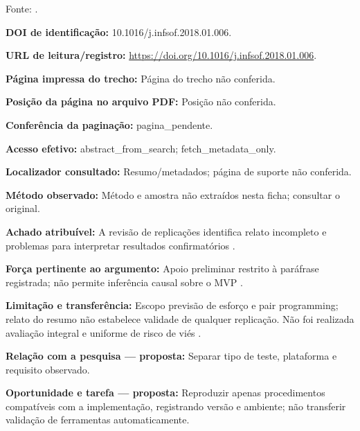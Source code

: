 Fonte: \citet{eng13}.

\noindent\textbf{DOI de identificação:} 10.1016/j.infsof.2018.01.006.\par\medskip

\noindent\textbf{URL de leitura/registro:} \url{https://doi.org/10.1016/j.infsof.2018.01.006}.\par\medskip

\noindent\textbf{Página impressa do trecho:} Página do trecho não conferida.\par\medskip

\noindent\textbf{Posição da página no arquivo PDF:} Posição não conferida.\par\medskip

\noindent\textbf{Conferência da paginação:} pagina\_pendente.\par\medskip

\noindent\textbf{Acesso efetivo:} abstract\_from\_search; fetch\_metadata\_only.\par\medskip

\noindent\textbf{Localizador consultado:} Resumo/metadados; página de suporte não conferida.\par\medskip

\noindent\textbf{Método observado:} Método e amostra não extraídos nesta ficha; consultar o original.\par\medskip

\noindent\textbf{Achado atribuível:} A revisão de replicações identifica relato incompleto e problemas para interpretar resultados confirmatórios \citep{eng13}.\par\medskip

\noindent\textbf{Força pertinente ao argumento:} Apoio preliminar restrito à paráfrase registrada; não permite inferência causal sobre o MVP \citep{eng13}.\par\medskip

\noindent\textbf{Limitação e transferência:} Escopo previsão de esforço e pair programming; relato do resumo não estabelece validade de qualquer replicação. Não foi realizada avaliação integral e uniforme de risco de viés \citep{eng13}.\par\medskip

\noindent\textbf{Relação com a pesquisa — proposta:} Separar tipo de teste, plataforma e requisito observado.\par\medskip

\noindent\textbf{Oportunidade e tarefa — proposta:} Reproduzir apenas procedimentos compatíveis com a implementação, registrando versão e ambiente; não transferir validação de ferramentas automaticamente.\par\medskip


